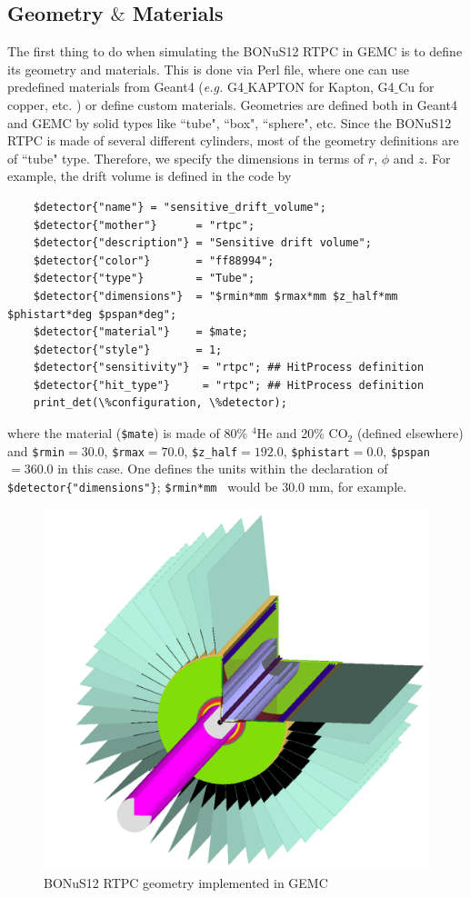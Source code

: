 \subsection{Geometry $\&$ Materials}
The first thing to do when simulating the BONuS12 RTPC in GEMC is to define its geometry and materials. This is done via Perl file, where one can use predefined materials from Geant4 (\textit{e.g.} G4$\_$KAPTON for Kapton, G4$\_$Cu for copper, etc. \cite{geant4}) or define custom materials. Geometries are defined both in Geant4 and GEMC by solid types like ``tube", ``box", ``sphere", etc. Since the BONuS12 RTPC is made of several different cylinders, most of the geometry definitions are of ``tube" type. Therefore, we specify the dimensions in terms of $r$, $\phi$ and $z$. For example, the drift volume is defined in the code by
\begin{lstlisting}
	$detector{"name"} = "sensitive_drift_volume";	
	$detector{"mother"}      = "rtpc";
	$detector{"description"} = "Sensitive drift volume";
	$detector{"color"}       = "ff88994";
	$detector{"type"}        = "Tube";
	$detector{"dimensions"}  = "$rmin*mm $rmax*mm $z_half*mm $phistart*deg $pspan*deg";
	$detector{"material"}    = $mate;
	$detector{"style"}       = 1;
	$detector{"sensitivity"}  = "rtpc"; ## HitProcess definition
	$detector{"hit_type"}     = "rtpc"; ## HitProcess definition
	print_det(\%configuration, \%detector);
\end{lstlisting}
where the material (\lstinline|$mate|) is made of 80$\%$ $^4$He and 20$\%$ CO$_2$ (defined elsewhere) and \lstinline|$rmin|$=30.0$, \lstinline|$rmax|$=70.0$, \lstinline|$z_half|$=192.0$, \lstinline|$phistart|$=0.0$, \lstinline|$pspan|$=360.0$ in this case. One defines the units within the declaration of \lstinline|$detector{"dimensions"}|;  \lstinline|$rmin*mm | would be $30.0$ mm, for example.
\begin{figure}[h!]
	\centering
	\includegraphics[width=0.8\linewidth]{figures/rtpc.png}
	\caption{BONuS12 RTPC geometry implemented in GEMC}
	\label{fig:gemc_rtpc}
\end{figure}

